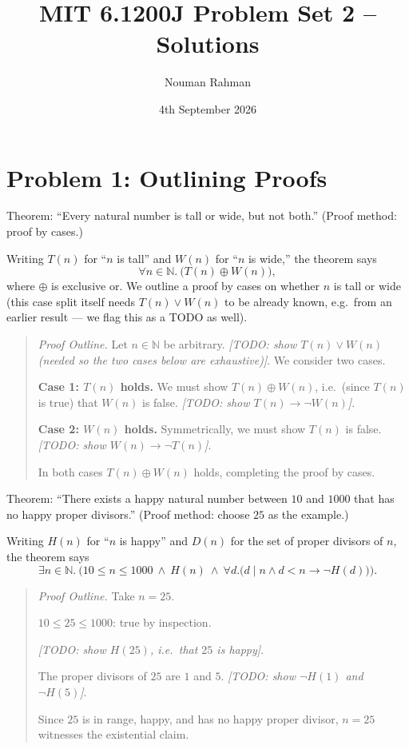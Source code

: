 \documentclass[11pt]{article}
\title{MIT 6.1200J Problem Set 2 – Solutions}
\author{Nouman Rahman}
\date{4th September 2026}
\newcommand{\N}{\mathbb{N}}
\newcommand{\TODO}[1]{\emph{[TODO: #1]}}
\newcommand{\partlabel}[1]{%
    \noindent\makebox[2em][l]{\textbf{(#1)}}%
}
\begin{document}
\maketitle

\section*{Problem 1: Outlining Proofs}

\partlabel{a}
Theorem: ``Every natural number is tall or wide, but not both.'' (Proof method: proof by cases.)

Writing $T(n)$ for ``$n$ is tall'' and $W(n)$ for ``$n$ is wide,'' the theorem says
\[
\forall n \in \N.\ \big(T(n) \oplus W(n)\big),
\]
where $\oplus$ is exclusive or. We outline a proof by cases on whether $n$ is tall or wide (this case split itself needs $T(n) \vee W(n)$ to be already known, e.g.\ from an earlier result — we flag this as a TODO as well).

\begin{quote}
\textit{Proof Outline.} Let $n \in \N$ be arbitrary. \TODO{show $T(n) \vee W(n)$ (needed so the two cases below are exhaustive)}. We consider two cases.

\textbf{Case 1: $T(n)$ holds.} We must show $T(n) \oplus W(n)$, i.e.\ (since $T(n)$ is true) that $W(n)$ is false. \TODO{show $T(n) \rightarrow \neg W(n)$}.

\textbf{Case 2: $W(n)$ holds.} Symmetrically, we must show $T(n)$ is false. \TODO{show $W(n) \rightarrow \neg T(n)$}.

In both cases $T(n) \oplus W(n)$ holds, completing the proof by cases.
\end{quote}

\bigskip

\partlabel{b}
Theorem: ``There exists a happy natural number between $10$ and $1000$ that has no happy proper divisors.'' (Proof method: choose $25$ as the example.)

Writing $H(n)$ for ``$n$ is happy'' and $D(n)$ for the set of proper divisors of $n$, the theorem says
\[
\exists n \in \N.\ \Big( 10 \le n \le 1000 \ \wedge\ H(n) \ \wedge\ \forall d.\big(d \mid n \wedge d < n \rightarrow \neg H(d)\big) \Big).
\]

\begin{quote}
\textit{Proof Outline.} Take $n = 25$.

$10 \le 25 \le 1000$: true by inspection.

\TODO{show $H(25)$, i.e.\ that $25$ is happy}.

The proper divisors of $25$ are $1$ and $5$. \TODO{show $\neg H(1)$ and $\neg H(5)$}.

Since $25$ is in range, happy, and has no happy proper divisor, $n = 25$ witnesses the existential claim.
\end{quote}
\end{document}
